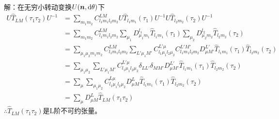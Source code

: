\documentclass[12pt]{article}
\numberwithin{equation}{section}	 %
\begin{document}
\begin{spacing}{1.5}
~\\
解：在无穷小转动变换$U(\bm{n},\mathop{}\!\mathrm{d}\theta)$下\\
\begin{align*}
U\hat{T}_{LM}(\tau_{1}\tau_{2})U^{-1} &= \sum_{m_{1}m_{2}}C_{l_{1}m_{1}l_{2}m_{2}}^{LM} U\hat{T}_{l_{1}m_{1}}(\tau_{1})U^{-1}U\hat{T}_{l_{2}m_{2}}(\tau_{2})U^{-1} \\
&= \sum_{m_{1}m_{2}}C_{l_{1}m_{1}l_{2}m_{2}}^{LM} \sum_{\mu_{1}}D_{\mu_{1}m_{1}}^{l_{1}} \hat{T}_{l_{1}m_{1}}(\tau_{1}) \sum_{\mu_{2}}D_{\mu_{2}m_{2}}^{l_{2}} \hat{T}_{l_{2}m_{2}}(\tau_{2}) \\
&= \sum_{\mu_{1}\mu_{2}m_{1}m_{2}}C_{l_{1}m_{1}l_{2}m_{2}}^{LM} \sum_{L'\mu_{1}M'}C_{l_{1}\mu_{1}l_{2}\mu_{2}}^{L'\mu}C_{l_{1}m_{1}l_{2}m_{2}}^{L'M'} D_{\mu M'}^{L'} \hat{T}_{l_{1}m_{1}}(\tau_{1})\hat{T}_{l_{2}m_{2}}(\tau_{2}) \\
&= \sum_{\mu_{1}\mu_{2}} \sum_{L'\mu_{1}M'}C_{l_{1}\mu_{1}l_{2}\mu_{2}}^{L'\mu} \delta_{LL'} \delta_{MM'} D_{\mu M'}^{L'} \hat{T}_{l_{1}m_{1}}(\tau_{1})\hat{T}_{l_{2}m_{2}}(\tau_{2}) \\
&= \sum_{\mu} \sum_{\mu_{1}\mu_{2}} C_{l_{1}\mu_{1}l_{2}\mu_{2}}^{L\mu} D_{\mu M}^{L} \hat{T}_{l_{1}m_{1}}(\tau_{1})\hat{T}_{l_{2}m_{2}}(\tau_{2}) \\
&= \sum_{\mu} D_{\mu M}^{L} \hat{T}_{LM}(\tau_{1}\tau_{2})
\end{align*}
$\therefore \hat{T}_{LM}(\tau_{1}\tau_{2})$是L阶不可约张量。 \\
~\\
~\\



\end{spacing}
\end{document}
